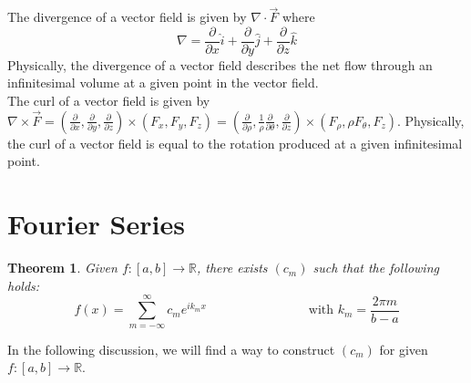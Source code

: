 \documentclass[11pt]{article}
\theoremstyle{break}
\theoremstyle{break}
\newtheorem{thm}{Theorem}[section]
\newcommand{\R}{\mathbb{R}}
\begin{document}
The divergence of a vector field is given by $\nabla\cdot \vec{F}$ where $$\nabla = \frac{\partial }{\partial x} \hat{i} + \frac{\partial }{\partial y	}\hat{j} + \frac{\partial }{\partial z} \hat{k}$$ Physically, the divergence of a vector field describes the net flow through an infinitesimal volume at a given point in the vector field. \\

The curl of a vector field is given by $\nabla \times \vec{F} = (\frac{\partial}{\partial x}, \frac{\partial}{\partial y},\frac{\partial}{\partial z}) \times (F_x,F_y,F_z) = (\frac{\partial }{\partial \rho}, \frac{1}{\rho}\frac{\partial}{\partial \theta},\frac{\partial}{\partial z}) \times (F_\rho , \rho F_\theta, F_z)$. Physically, the curl of a vector field is equal to the rotation produced at a given infinitesimal point. 

\newpage
\section{\color{red}Fourier Series}

\begin{thm}
Given $f:[a,b]\to \R$, there exists $(c_m)$ such that the following holds:
$$f(x) = \sum_{m=-\infty}^\infty c_m e^{ik_m x} \qquad\qquad\qquad\qquad \text{with }k_m=\frac{2\pi m}{b-a}$$
\end{thm}

In the following discussion, we will find a way to construct $(c_m)$ for given $f:[a,b]\to \R$.\\
\end{document}

